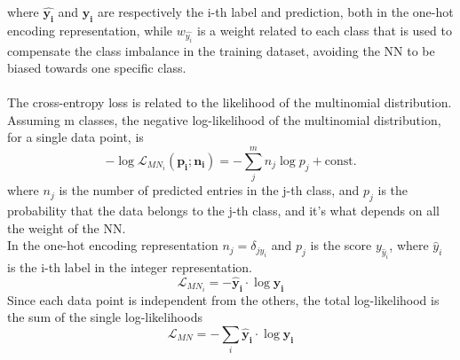 where $\bm{\hat{y_i}}$ and $\bm{y_i}$ are respectively the i-th label and prediction, both in the one-hot encoding representation, while $w_{\hat{y_i}}$ is a weight related to each class that is used to compensate the class imbalance in the training dataset, avoiding the NN to be biased towards one specific class.\\
\\
The cross-entropy loss is related to the likelihood of the multinomial distribution. Assuming m classes, the negative log-likelihood of the multinomial distribution, for a single data point, is\\
\begin{equation}
    -\log \mathcal{L}_{MN_{i}}(\bm{p_i};\bm{n_i})=-\sum_j^m n_j \log p_j + \text{const.}
\end{equation}
where $n_j$ is the number of predicted entries in the j-th class, and $p_j$ is the probability that the data belongs to the j-th class, and it's what depends on all the weight of the NN.\\
In the one-hot encoding representation $n_j=\delta_{j\hat{y}_i}$ and $p_j$ is the score ${y}_{\hat{y}_i}$, where $\hat{y}_i$ is the i-th label in the integer representation.
\begin{equation}
    \mathcal{L}_{MN_{i}}=-\bm{\hat{y}_i} \cdot \log \bm{y_i}
\end{equation}
Since each data point is independent from the others, the total log-likelihood is the sum of the single log-likelihoods
\begin{equation}
    \mathcal{L}_{MN}=-\sum_i \bm{\hat{y}_i} \cdot \log \bm{y_i}
\end{equation}

